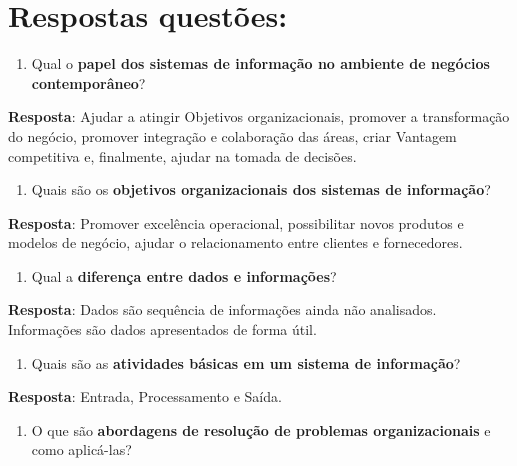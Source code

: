 \documentclass[
]{book}
\providecommand{\tightlist}{%
  \setlength{\itemsep}{0pt}\setlength{\parskip}{0pt}}
\begin{document}
\section{Respostas questões:}\label{respostas-questuxf5es}

\begin{enumerate}
\def\labelenumi{\arabic{enumi}.}
\tightlist
\item
  Qual o \textbf{papel dos sistemas de informação no ambiente de negócios contemporâneo}?
\end{enumerate}

\textbf{Resposta}: Ajudar a atingir Objetivos organizacionais, promover a transformação do negócio, promover integração e colaboração das áreas, criar Vantagem competitiva e, finalmente, ajudar na tomada de decisões.

\begin{enumerate}
\def\labelenumi{\arabic{enumi}.}
\setcounter{enumi}{1}
\tightlist
\item
  Quais são os \textbf{objetivos organizacionais dos sistemas de informação}?
\end{enumerate}

\textbf{Resposta}: Promover excelência operacional, possibilitar novos produtos e modelos de negócio, ajudar o relacionamento entre clientes e fornecedores.

\begin{enumerate}
\def\labelenumi{\arabic{enumi}.}
\setcounter{enumi}{2}
\tightlist
\item
  Qual a \textbf{diferença entre dados e informações}?
\end{enumerate}

\textbf{Resposta}: Dados são sequência de informações ainda não analisados. Informações são dados apresentados de forma útil.

\begin{enumerate}
\def\labelenumi{\arabic{enumi}.}
\setcounter{enumi}{3}
\tightlist
\item
  Quais são as \textbf{atividades básicas em um sistema de informação}?
\end{enumerate}

\textbf{Resposta}: Entrada, Processamento e Saída.

\begin{enumerate}
\def\labelenumi{\arabic{enumi}.}
\setcounter{enumi}{4}
\tightlist
\item
  O que são \textbf{abordagens de resolução de problemas organizacionais} e como aplicá-las?
\end{enumerate}
\end{document}
